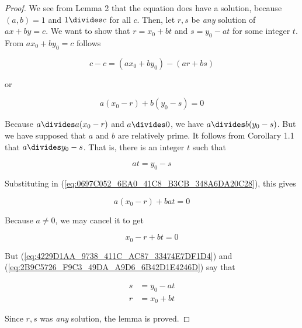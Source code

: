 \documentclass{article}
\theoremstyle{definition} %
\theoremstyle{definition}
\theoremstyle{definition}
\theoremstyle{definition}
\begin{document}
  \begin{proof}
    We see from Lemma 2 that the equation does have a solution, because $(a, b) = 1$ and $1 \divides c$ for all
    $c$. Then, let $r, s$ be \textit{any} solution of $ax + by = c$. We want to show that $r = x_0 + bt$ and
    $s = y_0 - at$ for some integer $t$. From $ax_0 + by_0 = c$ follows
    
    \begin{equation*}
      c - c = (ax_0 + by_0) - (ar + bs)
    \end{equation*}
    
    or
    
    \begin{equation}
      a(x_0 - r) + b(y_0 - s) = 0
      \label{eq:0697C052_6EA0_41C8_B3CB_348A6DA20C28}
    \end{equation}
    
    Because $a \divides a(x_0 - r)$ and $a \divides 0$, we have $a \divides b(y_0 - s)$. But we have supposed that
    $a$ and $b$ are relatively prime. It follows from Corollary 1.1 that $a \divides y_0 - s$. That is, there is an integer
    $t$ such that
    
    \begin{equation}
      at = y_0 - s
      \label{eq:4229D1AA_9738_411C_AC87_33474E7DF1D4}
    \end{equation}
    
    Substituting in (\ref{eq:0697C052_6EA0_41C8_B3CB_348A6DA20C28}), this gives
    
    \begin{equation*}
      a(x_0 - r) + bat = 0
    \end{equation*}
    
    Because $a \neq 0$, we may cancel it to get
    
    \begin{equation}
      x_0 - r + bt = 0
      \label{eq:2B9C5726_F9C3_49DA_A9D6_6B42D1E4246D}
    \end{equation}
    
    But (\ref{eq:4229D1AA_9738_411C_AC87_33474E7DF1D4}) and (\ref{eq:2B9C5726_F9C3_49DA_A9D6_6B42D1E4246D}) say that
    
    \begin{align*}
      s &= y_0 - at \\
      r &= x_0 + bt
    \end{align*}
    
    Since $r, s$ was \textit{any} solution, the lemma is proved.
  \end{proof}
  
\end{document}
